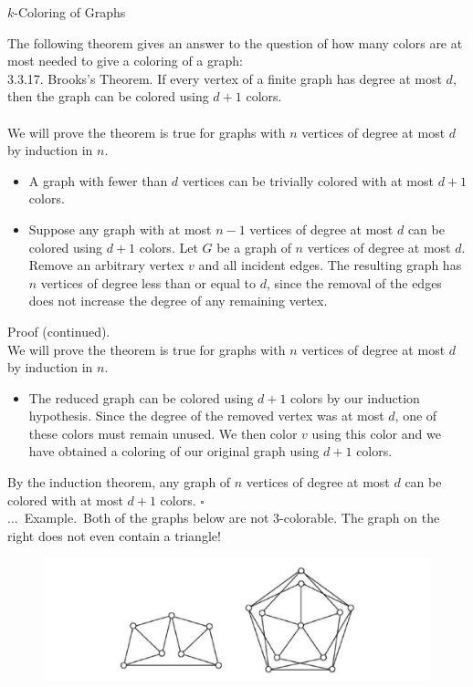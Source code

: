 \documentclass[smaller,hyperref={CJKbookmarks=true}]{beamer}
\newenvironment{PROOF}{{\noindent\!\sf\alert{Proof.}}\\}{\hfill$\square$\\}
\newcounter{zhuo}[subsection]
\renewcommand{\thezhuo}{\thesection.\thesubsection.\arabic{zhuo}}
\newenvironment{EXAMPLE}{\stepcounter{zhuo}\alert{\!\thezhuo.~Example.\,}}{}
\begin{document}
\begin{frame}{$k$-Coloring of Graphs}
\begin{spacing}{1.1}
The following theorem gives an answer to the question of how many colors
are at most needed to give a coloring of a graph:\\
\alert{3.3.17. Brooks's Theorem.} If every vertex of a finite graph has degree at
most $d$, then the graph can be colored using $d+1$ colors.\\
\begin{PROOF}
We will prove the theorem is true for graphs with $n$ vertices of degree at most $d$ by induction in $n$.
\begin{itemize}
  \item A graph with fewer than $d$ vertices can be trivially colored with at most $d+1$ colors.
  \item Suppose any graph with at most $n-1$ vertices of degree at most $d$ can be colored using $d+1$ colors. Let $G$ be a graph of $n$ vertices of degree at most $d$. Remove an arbitrary vertex $v$ and all incident edges. The resulting graph has $n$ vertices of degree less than or equal to $d$, since the removal of the edges does not increase the degree of any remaining vertex.
\end{itemize}
\newpage
\alert{Proof (continued).}\\
We will prove the theorem is true for graphs with $n$ vertices of degree at
most $d$ by induction in $n$.
\begin{itemize}
  \item The reduced graph can be colored using $d + 1$ colors by our induction hypothesis. Since the degree of the removed vertex was at most $d$, one of these colors must remain unused. We then color $v$ using this color and we have obtained a coloring of our original graph using $d + 1$ colors.
\end{itemize}
By the induction theorem, any graph of $n$ vertices of degree at most $d$ can be colored with at most $d+1$ colors.
\end{PROOF}
\newpage
\vspace*{7pt}
\begin{EXAMPLE}
Both of the graphs below are not 3-colorable. The graph
on the right does not even contain a triangle!
\begin{figure}
  \centering
  \includegraphics[width=\textwidth]{graph1}
\end{figure}
\end{EXAMPLE}
\end{spacing}
\end{frame}
\end{document}
